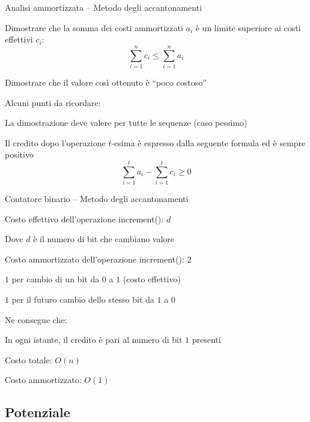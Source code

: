 \begin{frame}{Analisi ammortizzata -- Metodo degli accantonamenti}

\vspace{-9pt}
\begin{myboxtitle}[Obiettivi]
\BI
\item Dimostrare che la somma dei costi ammortizzati $a_i$ è un limite superiore ai costi effettivi $c_i$:
\[
 \sum_{i=1}^n c_i \leq \sum_{i=1}^n a_i
\]
\item Dimostrare che il valore così ottenuto è “poco costoso”
\EI
\end{myboxtitle}

\bigskip
Alcuni punti da ricordare:
\BI
\item La dimostrazione deve valere per tutte le sequenze (caso pessimo)
\item Il credito dopo l'operazione $t$-esima è espresso dalla seguente formula ed è sempre positivo
\EI
\[
 \sum_{i=1}^t a_i - \sum_{i=1}^t c_i \geq 0
\]

\end{frame}

\begin{frame}{Contatore binario  -- Metodo degli accantonamenti}

\BI
\item Costo effettivo dell'operazione \textsf{increment}(): \alert{$d$} \\
\BI
  \item Dove $d$ è il numero di bit che cambiano valore
\EI
\item Costo ammortizzato dell'operazione \textsf{increment}(): \alert{$2$}
\BI 
  \item $1$ per cambio di un bit da $0$ a $1$ (costo effettivo)
  \item $1$ per il futuro cambio dello stesso bit da $1$ a $0$
\EI
\item  Ne consegue che: 
\BI
\item In ogni istante, il credito è pari al numero di bit $1$  presenti
\item Costo totale: $O(n)$
\item Costo ammortizzato: $O(1)$
\EI
\EI
\end{frame}

\subsection{Potenziale}

